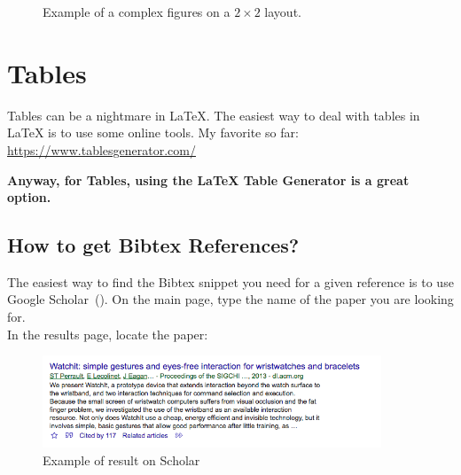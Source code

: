 \begin{figure}[!h]
\begin{subfigure}[t]{.5\textwidth}
  \end{subfigure}
  \caption{Example of a complex figures on a $2\times2$ layout.}
  \label{fig:drake}
\end{figure}

\section{Tables}
Tables can be a nightmare in LaTeX.
The easiest way to deal with tables in LaTeX is to use some online tools.
My favorite so far: \url{https://www.tablesgenerator.com/}

\textbf{Anyway, for Tables, using the LaTeX Table Generator is a great option.}


\subsection{How to get Bibtex References?}
The easiest way to find the Bibtex snippet you need for a given reference is to use Google Scholar~(\cite{Scholar}).
On the main page, type the name of the paper you are looking for.
\\

In the results page, locate the paper:
\begin{figure}[!h]
  \centering
    \includegraphics[width=0.9\textwidth]{figures/scholarrefexample.png}
  \caption{Example of result on Scholar}
  \label{fig:scholarref}
\end{figure}

